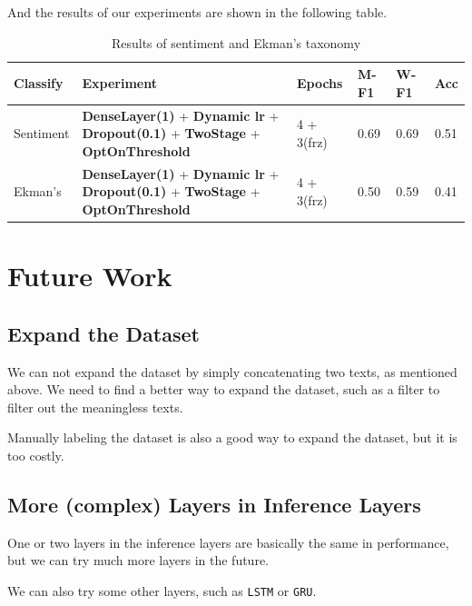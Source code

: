 \documentclass{article}
\begin{document}
And the results of our experiments are shown in the following table.

\begin{table}[H]
  \centering
  \renewcommand\arraystretch{1.5}
  \begin{tabular}{p{}p{}p{}p{}p{}p{}}
    \hline
    \textbf{Classify} & \textbf{Experiment}                                                                                                 & \textbf{Epochs} & \textbf{M-F1} & \textbf{W-F1} & \textbf{Acc} \\
    \hline
    \hline
    Sentiment         & \textbf{DenseLayer(1)} + \textbf{Dynamic lr} + \textbf{Dropout(0.1)} + \textbf{TwoStage} +  \textbf{OptOnThreshold} & 4 + 3(frz)      & 0.69          & 0.69          & 0.51         \\
    \hline
    Ekman's           & \textbf{DenseLayer(1)} + \textbf{Dynamic lr} + \textbf{Dropout(0.1)} +  \textbf{TwoStage} + \textbf{OptOnThreshold} & 4 + 3(frz)      & 0.50          & 0.59          & 0.41         \\
    \hline
  \end{tabular}
  \vspace{0.2cm}
  \caption{Results of sentiment and Ekman's taxonomy}
\end{table}


\section{Future Work}
\subsection{Expand the Dataset}
We can not expand the dataset by simply concatenating two texts, as mentioned above. We need to find a better way to expand the dataset, such as a filter to filter out the meaningless texts.

Manually labeling the dataset is also a good way to expand the dataset, but it is too costly.


\subsection{More (complex) Layers in Inference Layers}

One or two layers in the inference layers are basically the same in performance, but we can try much more layers in the future.

We can also try some other layers, such as \texttt{LSTM} or \texttt{GRU}.
\end{document}
